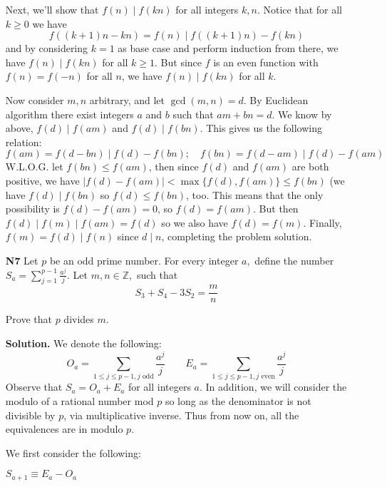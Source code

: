 \documentclass[11pt,a4paper]{article}
\begin{document}
\begin{enumerate}
    Next, we'll show that $f(n)\mid f(kn)$ for all integers $k, n$. 
    Notice that for all $k\ge 0$ we have 
    \begin{equation}
    	f((k+1)n - kn) = f(n)\mid f((k+1)n) - f(kn)
    \end{equation}
    and by considering $k=1$ as base case and perform induction from there, we have $f(n)\mid f(kn)$ for all $k\ge 1$. But since $f$ is an even function with $f(n)=f(-n)$ for all $n$, we have $f(n)\mid f(kn)$ for all $k$. 
	
	Now consider $m, n$ arbitrary, and let $\gcd(m, n)=d$. By Euclidean algorithm there exist integers $a$ and $b$ such that $am+bn=d$. We know by above, $f(d)\mid f(am)$ and $f(d)\mid f(bn)$. This gives us the following relation: 
	\[f(am)=f(d-bn)\mid f(d)-f(bn);\quad
	  f(bn)=f(d-am)\mid f(d)-f(am)
	\]
	W.L.O.G. let $f(bn)\le f(am)$, then since $f(d)$ and $f(am)$ are both positive, we have $|f(d)-f(am)|<\max\{f(d), f(am)\}\le f(bn)$ (we have $f(d)\mid f(bn)$ so $f(d)\le f(bn)$, too. This means that the only possibility is $f(d)-f(am)=0$, so $f(d)=f(am)$. But then $f(d)\mid f(m)\mid f(am)=f(d)$ so we also have $f(d)=f(m)$. Finally, $f(m)=f(d)\mid f(n)$ since $d\mid n$, completing the problem solution. 
	
	\item [\textbf{N7}]
	Let $p$ be an odd prime number. 
	For every integer $a,$ define the number $S_a = \sum^{p-1}_{j=1} \frac{a^j}{j}.$ Let $m,n \in \mathbb{Z},$ such that 
	\[S_3 + S_4 - 3S_2 = \frac{m}{n}\] 
	
	Prove that $p$ divides $m.$
	
	\textbf{Solution.} 
	We denote the following: 
	\begin{equation}
		O_a = \sum_{1\le j\le p-1, j\text{ odd}} \frac{a^j}{j}
		\qquad 
		E_a = \sum_{1\le j\le p-1, j\text{ even}} \frac{a^j}{j}
	\end{equation}
    Observe that $S_a = O_a + E_a$ for all integers $a$. 
    In addition, 
    we will consider the modulo of a rational number mod $p$ so long as the denominator is not divisible by $p$, 
    via multiplicative inverse. 
    Thus from now on, all the equivalences are in modulo $p$. 
    
    We first consider the following: 
    
    \begin{lemma}
    	$S_{a + 1}\equiv E_a - O_a$
    \end{lemma}
    

\end{enumerate}
\end{document}
